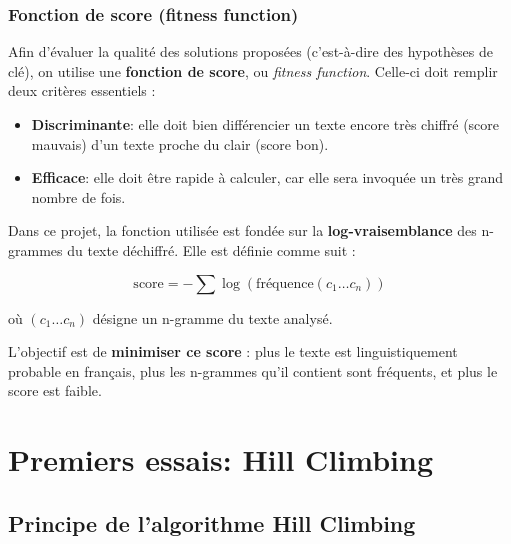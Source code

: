 \documentclass[a4paper]{article}
\begin{document}
\subsubsection{Fonction de score (fitness function)}

Afin d’évaluer la qualité des solutions proposées (c’est-à-dire des hypothèses de clé), on utilise une \textbf{fonction de score}, ou \textit{fitness function}. Celle-ci doit remplir deux critères essentiels :

\begin{itemize}
    \item \textbf{Discriminante}: elle doit bien différencier un texte encore très chiffré (score mauvais) d’un texte proche du clair (score bon).
    \item \textbf{Efficace}: elle doit être rapide à calculer, car elle sera invoquée un très grand nombre de fois.
\end{itemize}

Dans ce projet, la fonction utilisée est fondée sur la \textbf{log-vraisemblance} des n-grammes du texte déchiffré. Elle est définie comme suit :

\[
\text{score} = - \sum \log\left(\text{fréquence}(c_1 \ldots c_n)\right)
\]

où $(c_1 \ldots c_n)$ désigne un n-gramme du texte analysé.

L’objectif est de \textbf{minimiser ce score} : plus le texte est linguistiquement probable en français, plus les n-grammes qu’il contient sont fréquents, et plus le score est faible.


\section{Premiers essais: Hill Climbing}

\subsection{Principe de l’algorithme Hill Climbing}
\end{document}
